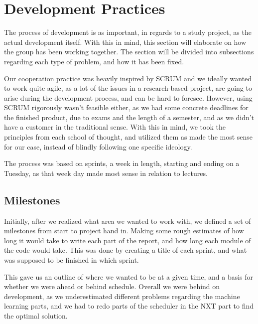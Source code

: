 \section{Development Practices}
The process of development is as important, in regards to a study project, as the actual development itself.
With this in mind, this section will elaborate on how the group has been working together.
The section will be divided into subsections regarding each type of problem, and how it has been fixed.


Our cooperation practice was heavily inspired by SCRUM and we ideally wanted to work quite agile, as a lot of the issues in a research-based project, are going to arise during the development process, and can be hard to foresee.
However, using SCRUM rigorously wasn't feasible either, as we had some concrete deadlines for the finished product, due to exams and the length of a semester, and as we didn't have a customer in the traditional sense.
With this in mind, we took the principles from each school of thought, and utilized them as made the most sense for our case, instead of blindly following one specific ideology.


The process was based on sprints, a week in length, starting and ending on a Tuesday, as that week day made most sense in relation to lectures.


\subsection{Milestones}
Initially, after we realized what area we wanted to work with, we defined a set of milestones from start to project hand in.
Making some rough estimates of how long it would take to write each part of the report, and how long each module of the code would take.
This was done by creating a title of each sprint, and what was supposed to be finished in which sprint.


This gave us an outline of where we wanted to be at a given time, and a basis for whether we were ahead or behind schedule.
Overall we were behind on development, as we underestimated different problems regarding the machine learning parts, and we had to redo parts of the scheduler in the NXT part to find the optimal solution.


